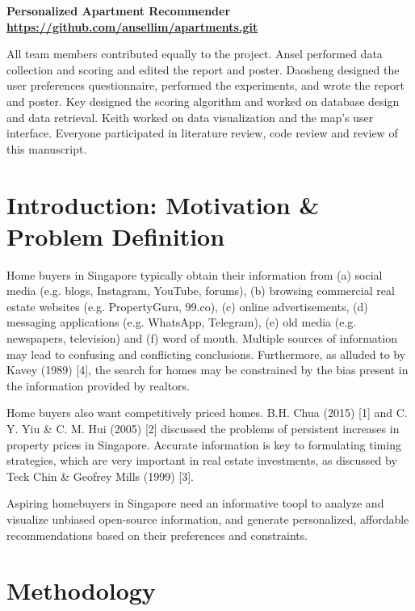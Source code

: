 \documentclass[a4paper, 11pt]{article}
\begin{document}
	\begin{center}
		\sc\large\textbf{Personalized Apartment Recommender \\
\url{https://github.com/ansellim/apartments.git}}\\
	\end{center}

{All team members contributed equally to the project. Ansel performed data collection and scoring and edited the report and poster. Daosheng designed the user preferences questionnaire, performed the experiments, and wrote the report and poster. Key designed the scoring algorithm and worked on database design and data retrieval. Keith worked on data visualization and the map's user interface. Everyone participated in literature review, code review and review of this manuscript.}

	\section{Introduction: Motivation \& Problem Definition}
	
	Home buyers in Singapore typically obtain their information from (a) social media (e.g. blogs, Instagram, YouTube, forums), (b) browsing commercial real estate websites (e.g. PropertyGuru, 99.co), (c) online advertisements, (d) messaging applications (e.g. WhatsApp, Telegram), (e) old media (e.g. newspapers, television) and (f) word of mouth. Multiple sources of information may lead to confusing and conflicting conclusions. Furthermore, as alluded to by Kavey (1989) [4], the search for homes may be constrained by the bias present in the information provided by realtors.
	
	Home buyers also want competitively priced homes. B.H. Chua (2015) [1] and C. Y. Yiu \& C. M. Hui (2005) [2] discussed the problems of persistent increases in property prices in Singapore. Accurate information is key to formulating timing strategies, which are very important in real estate investments, as discussed by Teck Chin \& Geofrey Mills (1999) [3].

 Aspiring homebuyers in Singapore need an informative toopl to analyze and visualize unbiased open-source information, and generate personalized, affordable recommendations based on their preferences and constraints.

	\section{Methodology}
	
\end{document}
